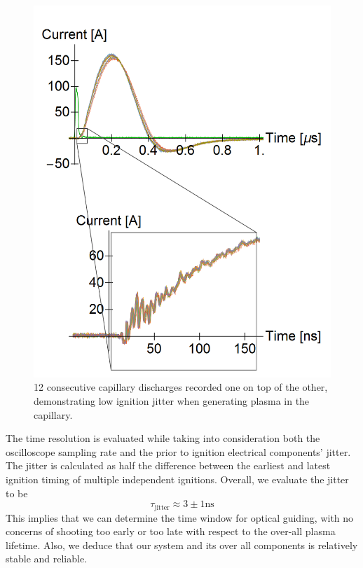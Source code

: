 \documentclass[../main.tex]{subfiles}
\begin{document}
\begin{figure}
    \centering
    \includegraphics[width=\textwidth]{figures/jitter/low_jitter.png}
    \caption{12 consecutive capillary discharges recorded one on top of the other, demonstrating low ignition jitter when generating plasma in the capillary.}
    \label{fig:low_jitter}
\end{figure}

The time resolution is evaluated while taking into consideration both the oscilloscope sampling rate and the prior to ignition electrical components' jitter. The jitter is calculated as half the difference between the earliest and latest ignition timing of multiple independent ignitions. Overall, we evaluate the jitter to be
\begin{equation}
	\tau_\text{jitter}\approx 3\pm 1\si{\ns}
\end{equation}
This implies that we can determine the time window for optical guiding, with no concerns of shooting too early or too late with respect to the over-all plasma lifetime. Also, we deduce that our system and its over all components is relatively stable and reliable.
\end{document}
